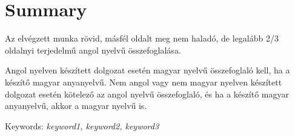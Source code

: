 \chapter*{Summary}

Az elvégzett munka rövid, másfél oldalt meg nem haladó, de legalább 2/3 
oldalnyi terjedelmű angol nyelvű összefoglalása.

Angol nyelven készített dolgozat esetén magyar nyelvű összefoglaló kell, ha a
készítő magyar anyanyelvű. Nem angol vagy nem magyar nyelven készített
dolgozat esetén kötelező az angol nyelvű összefoglaló, és ha a készítő magyar
anyanyelvű, akkor a magyar nyelvű is.

\vspace{0.5cm}
Keywords: \emph{keyword1, keyword2, keyword3}
\vspace{0.5cm}
